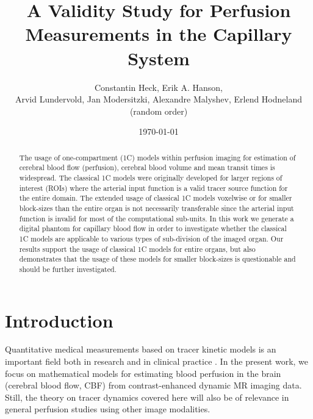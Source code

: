 \documentclass[paper=a4, fontsize=11pt,parskip=half,headings=small]{scrartcl}
\title{A Validity Study for Perfusion Measurements in the Capillary System}
\author{Constantin Heck, Erik A. Hanson, \\ Arvid Lundervold, Jan Modersitzki, Alexandre Malyshev, Erlend Hodneland \\ (random order)}
\date{\today}
\begin{document}
	\maketitle

	\begin{abstract}
		The usage of one-compartment (1C) models within perfusion imaging for estimation of cerebral blood flow (perfusion), cerebral blood volume and mean transit times is widespread. The classical 1C models were originally developed for larger regions of interest (ROIs) where the arterial input function is a valid tracer source function for the entire domain. The extended usage of classical 1C models voxelwise or for smaller block-sizes than the entire organ is not necessarily transferable since the arterial input function is invalid for most of the computational sub-units. In this work we generate a digital phantom for capillary blood flow in order to investigate whether the classical 1C models are applicable to various types of sub-division of the imaged organ. Our results support the usage of classical 1C models for entire organs, but also demonstrates that the usage of these models for smaller block-sizes is questionable and should be further investigated.
	\end{abstract}

	\section{Introduction}
	
	Quantitative medical measurements based on tracer kinetic models is an important field both in research and in clinical practice \cite{zierler62,axel80,zierler00}. 
	In the present work, we focus on mathematical models for estimating blood perfusion in the brain (cerebral blood flow, CBF) from contrast-enhanced dynamic MR 	imaging data. Still, the theory on tracer dynamics covered here will also be of relevance in general perfusion studies using other image modalities.
\end{document}
